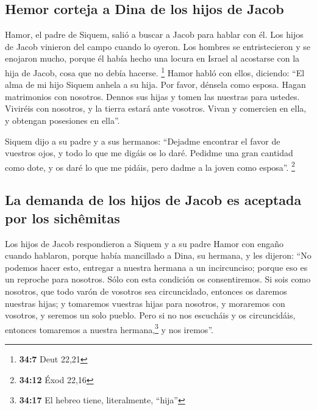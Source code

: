 \begin{paracol}{2}
{\subsection{Hemor corteja a Dina de los hijos de
Jacob}\label{hemor-corteja-a-dina-de-los-hijos-de-jacob}}

 Hamor, el padre de Siquem, salió a buscar a Jacob para
hablar con él.  Los hijos de Jacob vinieron del campo
cuando lo oyeron. Los hombres se entristecieron y se enojaron mucho,
porque él había hecho una locura en Israel al acostarse con la hija de
Jacob, cosa que no debía hacerse. \footnote{\textbf{34:7} Deut 22,21}
 Hamor habló con ellos, diciendo: ``El alma de mi hijo
Siquem anhela a su hija. Por favor, dénsela como esposa. 
Hagan matrimonios con nosotros. Dennos sus hijas y tomen las nuestras
para ustedes.  Viviréis con nosotros, y la tierra estará
ante vosotros. Vivan y comercien en ella, y obtengan posesiones en
ella''.

 Siquem dijo a su padre y a sus hermanos: ``Dejadme
encontrar el favor de vuestros ojos, y todo lo que me digáis os lo daré.
 Pedidme una gran cantidad como dote, y os daré lo que me
pidáis, pero dadme a la joven como esposa''. \footnote{\textbf{34:12}
  Éxod 22,16}

\hypertarget{la-demanda-de-los-hijos-de-jacob-es-aceptada-por-los-sichuxeamitas}{%
\subsection{La demanda de los hijos de Jacob es aceptada por los
sichêmitas}\label{la-demanda-de-los-hijos-de-jacob-es-aceptada-por-los-sichuxeamitas}}

 Los hijos de Jacob respondieron a Siquem y a su padre
Hamor con engaño cuando hablaron, porque había mancillado a Dina, su
hermana,  y les dijeron: ``No podemos hacer esto,
entregar a nuestra hermana a un incircunciso; porque eso es un reproche
para nosotros.  Sólo con esta condición os consentiremos.
Si sois como nosotros, que todo varón de vosotros sea circuncidado,
 entonces os daremos nuestras hijas; y tomaremos vuestras
hijas para nosotros, y moraremos con vosotros, y seremos un solo pueblo.
 Pero si no nos escucháis y os circuncidáis, entonces
tomaremos a nuestra hermana,\footnote{\textbf{34:17} El hebreo tiene,
  literalmente, ``hija''} y nos iremos''.


\end{paracol}
